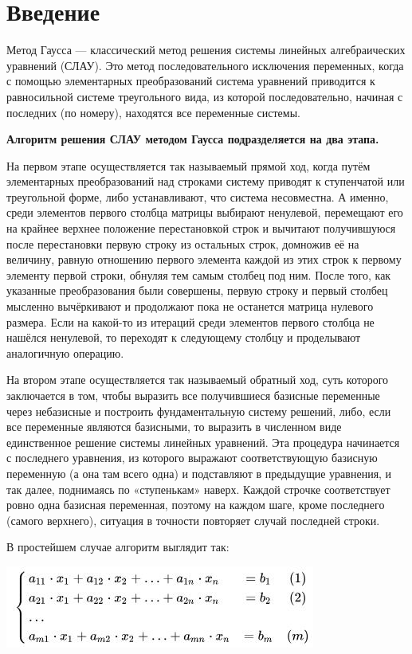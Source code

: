 \documentclass[12pt,a4paper]{scrartcl}
\begin{document}
\section{Введение}
\label{sec:intro}

Метод Гаусса — классический метод решения системы линейных алгебраических уравнений (СЛАУ). Это метод последовательного исключения переменных, когда с помощью элементарных преобразований система уравнений приводится к равносильной системе треугольного вида, из которой последовательно, начиная с последних (по номеру), находятся все переменные системы.

{\vspace {0.25cm} \bf Алгоритм решения СЛАУ методом Гаусса подразделяется на два этапа.}

\vspace {0.25cm} На первом этапе осуществляется так называемый прямой ход, когда путём элементарных преобразований над строками систему приводят к ступенчатой или треугольной форме, либо устанавливают, что система несовместна. А именно, среди элементов первого столбца матрицы выбирают ненулевой, перемещают его на крайнее верхнее положение перестановкой строк и вычитают получившуюся после перестановки первую строку из остальных строк, домножив её на величину, равную отношению первого элемента каждой из этих строк к первому элементу первой строки, обнуляя тем самым столбец под ним. После того, как указанные преобразования были совершены, первую строку и первый столбец мысленно вычёркивают и продолжают пока не останется матрица нулевого размера. Если на какой-то из итераций среди элементов первого столбца не нашёлся ненулевой, то переходят к следующему столбцу и проделывают аналогичную операцию.

На втором этапе осуществляется так называемый обратный ход, суть которого заключается в том, чтобы выразить все получившиеся базисные переменные через небазисные и построить фундаментальную систему решений, либо, если все переменные являются базисными, то выразить в численном виде единственное решение системы линейных уравнений. Эта процедура начинается с последнего уравнения, из которого выражают соответствующую базисную переменную (а она там всего одна) и подставляют в предыдущие уравнения, и так далее, поднимаясь по «ступенькам» наверх. Каждой строчке соответствует ровно одна базисная переменная, поэтому на каждом шаге, кроме последнего (самого верхнего), ситуация в точности повторяет случай последней строки.

В простейшем случае алгоритм выглядит так:
\begin{center}
\includegraphics[width=0.5 \textwidth]{1.jpg}
\end{center}
\end{document}
